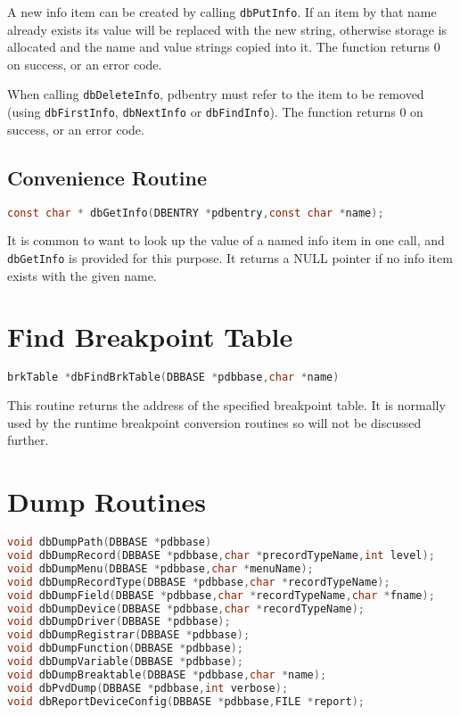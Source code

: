 A new info item can be created by calling \verb|dbPutInfo|.
If an item by that name already exists its value will be replaced with the new string, otherwise storage is allocated and the name and value strings copied into it.
The function returns 0 on success, or an error code.

When calling \verb|dbDeleteInfo|, pdbentry must refer to the item to be removed (using \verb|dbFirstInfo|, \verb|dbNextInfo| or \verb|dbFindInfo|).
The function returns 0 on success, or an error code.

\subsection{Convenience Routine}

\begin{lstlisting}[language=C]
const char * dbGetInfo(DBENTRY *pdbentry,const char *name);
\end{lstlisting}

It is common to want to look up the value of a named info item in one call, and \verb|dbGetInfo| is provided for this purpose. It returns a NULL pointer if no info item exists with the given name.

\section{Find Breakpoint Table}

\begin{lstlisting}[language=C]
brkTable *dbFindBrkTable(DBBASE *pdbbase,char *name)
\end{lstlisting}

This routine returns the address of the specified breakpoint table.
It is normally used by the runtime breakpoint conversion routines so will not be discussed further.

\section{Dump Routines}

\begin{lstlisting}[language=C]
void dbDumpPath(DBBASE *pdbbase)
void dbDumpRecord(DBBASE *pdbbase,char *precordTypeName,int level);
void dbDumpMenu(DBBASE *pdbbase,char *menuName);
void dbDumpRecordType(DBBASE *pdbbase,char *recordTypeName);
void dbDumpField(DBBASE *pdbbase,char *recordTypeName,char *fname);
void dbDumpDevice(DBBASE *pdbbase,char *recordTypeName);
void dbDumpDriver(DBBASE *pdbbase);
void dbDumpRegistrar(DBBASE *pdbbase);
void dbDumpFunction(DBBASE *pdbbase);
void dbDumpVariable(DBBASE *pdbbase);
void dbDumpBreaktable(DBBASE *pdbbase,char *name);
void dbPvdDump(DBBASE *pdbbase,int verbose);
void dbReportDeviceConfig(DBBASE *pdbbase,FILE *report);
\end{lstlisting}

